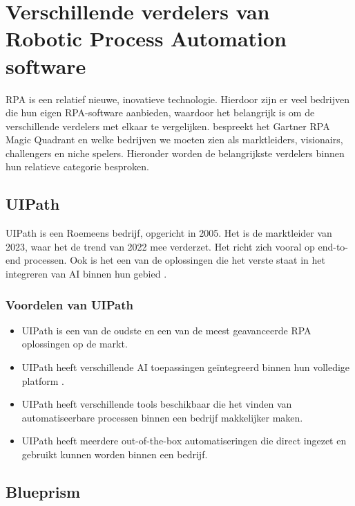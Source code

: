 \section{Verschillende verdelers van Robotic Process Automation software}
\label{sec:verschillende-verdelers-van-rpa-software}

RPA is een relatief nieuwe, inovatieve technologie. Hierdoor zijn er veel bedrijven die hun eigen RPA-software aanbieden, waardoor het belangrijk is om de verschillende verdelers met elkaar te vergelijken. \textcite{Carter2023} bespreekt het Gartner RPA Magic Quadrant en welke bedrijven we moeten zien als marktleiders, visionairs, challengers en niche spelers. Hieronder worden de belangrijkste verdelers binnen hun relatieve categorie besproken.

\subsection{UIPath}
\label{subsec:uipath}

UIPath is een Roemeens bedrijf, opgericht in 2005. Het is de marktleider van 2023, waar het de trend van 2022 mee verderzet. Het richt zich vooral op end-to-end processen. Ook is het een van de oplossingen die het verste staat in het integreren van AI binnen hun gebied \autocite{GartnerUIPath2023}.

\subsubsection{Voordelen van UIPath}
\label{subsubsec:voordelen-van-uipath}

\begin{itemize}
    \item UIPath is een van de oudste en een van de meest geavanceerde RPA oplossingen op de markt.
    \item UIPath heeft verschillende AI toepassingen geïntegreerd binnen hun volledige platform \autocite{Liliana2022}.
    \item UIPath heeft verschillende tools beschikbaar die het vinden van automatiseerbare processen binnen een bedrijf makkelijker maken.
    \item UIPath heeft meerdere out-of-the-box automatiseringen die direct ingezet en gebruikt kunnen worden binnen een bedrijf.
\end{itemize}


\subsection{Blueprism}
\label{subsec:blueprism}

